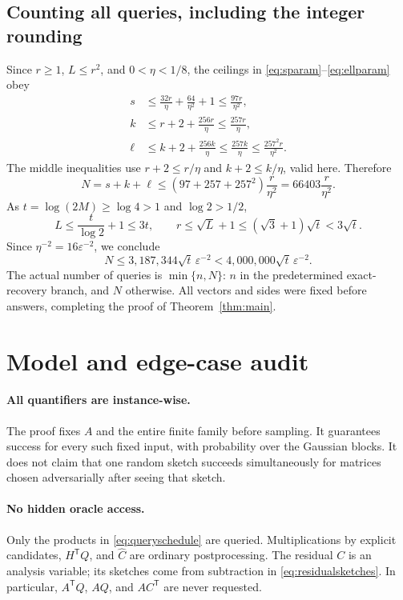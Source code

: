 \documentclass[11pt]{article}
\numberwithin{equation}{section}
\theoremstyle{remark}
\newcommand{\T}{\mathsf T}
\begin{document}
\subsection{Counting all queries, including the integer rounding}
Since $r\ge1$, $L\le r^2$, and $0<\eta<1/8$, the ceilings in
\eqref{eq:sparam}--\eqref{eq:ellparam} obey
\begin{align*}
 s&\le\frac{32r}{\eta}+\frac{64}{\eta^2}+1
   \le\frac{97r}{\eta^2},\\
 k&\le r+2+\frac{256r}{\eta}
   \le\frac{257r}{\eta},\\
 \ell&\le k+2+\frac{256k}{\eta}
   \le\frac{257k}{\eta}
   \le\frac{257^2r}{\eta^2}.
\end{align*}
The middle inequalities use $r+2\le r/\eta$ and $k+2\le k/\eta$, valid here.
Therefore
\begin{equation}\label{eq:Nbound}
 N=s+k+\ell\le(97+257+257^2)\frac r{\eta^2}
 =66403\frac r{\eta^2}.
\end{equation}
As $t=\log(2M)\ge\log4>1$ and $\log2>1/2$,
\[
 L\le\frac{t}{\log2}+1\le3t,\qquad
 r\le\sqrt L+1\le(\sqrt3+1)\sqrt t<3\sqrt t.
\]
Since $\eta^{-2}=16\varepsilon^{-2}$, we conclude
\begin{equation}\label{eq:constantcount}
 N\le3{,}187{,}344\sqrt t\,\varepsilon^{-2}
 <4{,}000{,}000\sqrt t\,\varepsilon^{-2}.
\end{equation}
The actual number of queries is $\min\{n,N\}$: $n$ in the predetermined exact-recovery branch, and $N$ otherwise.
All vectors and sides were fixed before answers, completing the proof of Theorem~\ref{thm:main}.

\section{Model and edge-case audit}\label{sec:audit}

\paragraph{All quantifiers are instance-wise.}
The proof fixes $A$ and the entire finite family before sampling. It guarantees success for every such fixed input, with probability over the Gaussian blocks. It does not claim that one random sketch succeeds simultaneously for matrices chosen adversarially after seeing that sketch.

\paragraph{No hidden oracle access.}
Only the products in \eqref{eq:queryschedule} are queried. Multiplications by explicit candidates, $H^\T Q$, and $\widehat C$ are ordinary postprocessing. The residual $C$ is an analysis variable; its sketches come from subtraction in \eqref{eq:residualsketches}. In particular, $A^\T Q$, $AQ$, and $AC^\T$ are never requested.
\end{document}
